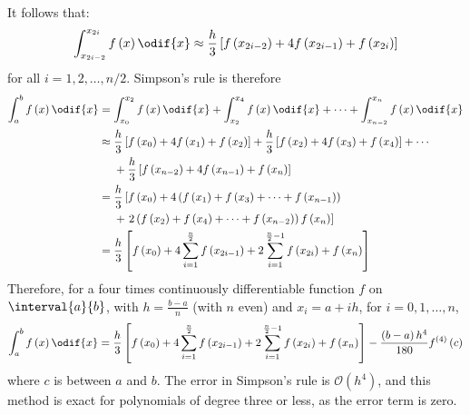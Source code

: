 \documentclass{article}
\begin{document}
It follows that:
\begin{equation*}
    \int_{x_{2i - 2}}^{x_{2i}} f\left( x \right) \odif{x} \approx \frac{h}{3} \left[ f\left( x_{2i - 2} \right) + 4f\left( x_{2i - 1} \right) + f\left( x_{2i} \right) \right]
\end{equation*}
for all \(i = 1, 2, \ldots, n/2\). Simpson's rule is therefore
\begin{align*}
    \int_a^b f\left( x \right) \odif{x} & = \int_{x_0}^{x_2} f\left( x \right) \odif{x} + \int_{x_2}^{x_4} f\left( x \right) \odif{x} + \cdots + \int_{x_{n - 2}}^{x_n} f\left( x \right) \odif{x}                                                         \\
                                        & \approx \begin{aligned}[t]
                                                       & \frac{h}{3} \left[ f\left( x_0 \right) + 4f\left( x_1 \right) + f\left( x_2 \right) \right] + \frac{h}{3} \left[ f\left( x_2 \right) + 4f\left( x_3 \right) + f\left( x_4 \right) \right] + \cdots \\
                                                       & + \frac{h}{3} \left[ f\left( x_{n - 2} \right) + 4f\left( x_{n - 1} \right) + f\left( x_n \right) \right]
                                                  \end{aligned} \\
                                        & = \begin{aligned}[t]
                                                 & \frac{h}{3} \left[ f\left( x_0 \right) + 4 \left( f\left( x_1 \right) + f\left( x_3 \right) + \cdots + f\left( x_{n - 1} \right) \right) \right. \\
                                                 & + \left. 2 \left( f\left( x_2 \right) + f\left( x_4 \right) + \cdots + f\left( x_{n - 2} \right) \right) f\left( x_n \right) \right]
                                            \end{aligned}                                              \\
                                        & = \frac{h}{3} \left[ f\left( x_0 \right) + 4 \sum_{i = 1}^{\frac{n}{2}} f\left( x_{2i - 1} \right) + 2 \sum_{i = 1}^{\frac{n}{2} - 1} f\left( x_{2i} \right) + f\left( x_n \right) \right]
\end{align*}
Therefore, for a four times continuously differentiable function \(f\) on \(\interval{a}{b}\), with \(h = \frac{b - a}{n}\) (with \(n\) even) and \(x_i = a + i h\), for \(i = 0, 1, \ldots, n\),
\begin{equation*}
    \int_a^b f\left( x \right) \odif{x} = \frac{h}{3} \left[ f\left( x_0 \right) + 4 \sum_{i = 1}^{\frac{n}{2}} f\left( x_{2i - 1} \right) + 2 \sum_{i = 1}^{\frac{n}{2} - 1} f\left( x_{2i} \right) + f\left( x_n \right) \right] - \frac{\left( b - a \right) h^4}{180} f^{\left( 4 \right)}\left( c \right)
\end{equation*}
where \(c\) is between \(a\) and \(b\). The error in Simpson's rule is \(\mathcal{O}\left( h^4 \right)\), and this method is exact for polynomials of degree three or less, as the error term is zero.
\end{document}
